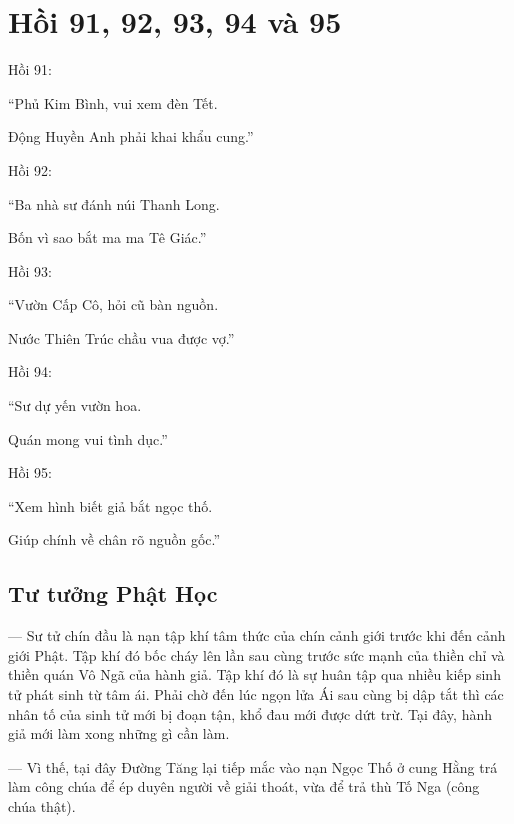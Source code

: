 \chapter{Hồi 91, 92, 93, 94 và 95} %
\label{cha:hoi_91_92_95}

Hồi 91:

\begin{itshape}
``Phủ Kim Bình, vui xem đèn Tết.

Động Huyền Anh phải khai khẩu cung.''
\end{itshape}

Hồi 92:

\begin{itshape}
``Ba nhà sư đánh núi Thanh Long.

Bốn vì sao bắt ma ma Tê Giác.''
\end{itshape}

Hồi 93:

\begin{itshape}
``Vườn Cấp Cô, hỏi cũ bàn nguồn.

Nước Thiên Trúc chầu vua được vợ.''
\end{itshape}

Hồi 94:

\begin{itshape}
``Sư dự yến vườn hoa.

Quán mong vui tình dục.''
\end{itshape}

Hồi 95:

\begin{itshape}
``Xem hình biết giả bắt ngọc thố.

Giúp chính về chân rõ nguồn gốc.''
\end{itshape}

\section{Tư tưởng Phật Học} %
\label{sec:91_92_95_phat_hoc}

--- Sư tử chín đầu là nạn tập khí tâm thức của chín cảnh giới trước khi đến cảnh giới Phật. Tập khí đó bốc cháy lên lần sau cùng trước sức mạnh của thiền chỉ và thiền quán Vô Ngã của hành giả. Tập khí đó là sự huân tập qua nhiều kiếp sinh tử phát sinh từ tâm ái. Phải chờ đến lúc ngọn lửa Ái sau cùng bị dập tắt thì các nhân tố của sinh tử mới bị đoạn tận, khổ đau mới được dứt trừ. Tại đây, hành giả mới làm xong những gì cần làm.

--- Vì thế, tại đây Đường Tăng lại tiếp mắc vào nạn Ngọc Thố ở cung Hằng trá làm công chúa để ép duyên người về giải thoát, vừa để trả thù Tố Nga (công chúa thật).

